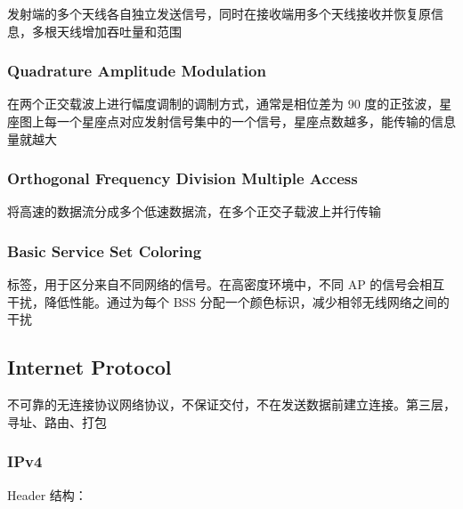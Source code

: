 \documentclass[11pt,journal,compsoc]{IEEEtran}
\begin{document}
发射端的多个天线各自独立发送信号，同时在接收端用多个天线接收并恢复原信息，多根天线增加吞吐量和范围


\subsubsection{Quadrature Amplitude Modulation}

在两个正交载波上进行幅度调制的调制方式，通常是相位差为 90 度的正弦波，星座图上每一个星座点对应发射信号集中的一个信号，星座点数越多，能传输的信息量就越大


\subsubsection{Orthogonal Frequency Division Multiple Access}

将高速的数据流分成多个低速数据流，在多个正交子载波上并行传输


\subsubsection{Basic Service Set Coloring}

标签，用于区分来自不同网络的信号。在高密度环境中，不同 AP 的信号会相互干扰，降低性能。通过为每个 BSS 分配一个颜色标识，减少相邻无线网络之间的干扰


\subsection{Internet Protocol}

不可靠的无连接协议网络协议，不保证交付，不在发送数据前建立连接。第三层，寻址、路由、打包


\subsubsection{IPv4}

Header 结构：
\end{document}
